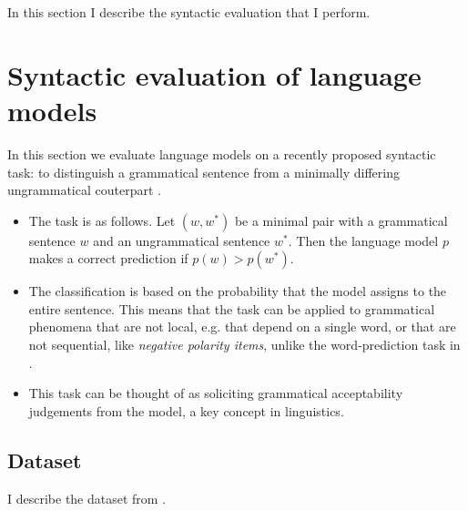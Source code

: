 % 

In this section I describe the syntactic evaluation that I perform.

\section{Syntactic evaluation of language models}
In this section we evaluate language models on a recently proposed syntactic task: to distinguish a grammatical sentence from a minimally differing ungrammatical couterpart \citep{Linzen+2018:targeted}.
\begin{itemize}
  \item The task is as follows. Let $(w, w^*)$ be a minimal pair with a grammatical sentence $w$ and an ungrammatical sentence $w^*$. Then the language model $p$ makes a correct prediction if $p(w) > p(w^*)$.
  \item The classification is based on the probability that the model assigns to the entire sentence. This means that the task can be applied to grammatical phenomena that are not local, e.g. that depend on a single word, or that are not sequential, like \textit{negative polarity items}, unlike the word-prediction task in \cite{Linzen+2016:LSTM-syntax}.
  \item This task can be thought of as soliciting grammatical acceptability judgements from the model, a key concept in linguistics.
\end{itemize}

\subsection{Dataset}
I describe the dataset from \citep{Linzen+2018:targeted}.

